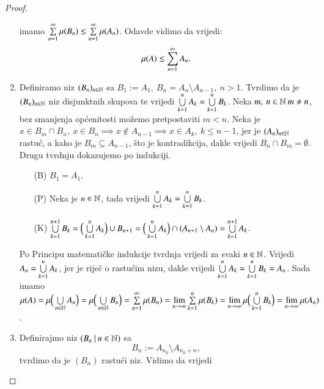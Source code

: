 \begin{proof}
\begin{enumerate}[label={(\roman*)}]
            imamo $\sum\limits_{n=1}^{\infty} \mu({B_n}) \leq \sum\limits_{n=1}^{\infty} \mu({A_n})$.
            Odavde vidimo da vrijedi:
            \begin{equation*}
                \mu({A}) \leq \sum\limits_{n=1}^{\infty} A_n.
            \end{equation*}
        \item Definiramo niz $(B_n)_{n \in \mathbb{N}}$ sa $B_1 := A_1, \: B_n = A_n \setminus
            A_{n-1}, \: n > 1$. Tvrdimo da je $(B_n)_{n \in \mathbb{N}}$ niz disjunktnih skupova
            te vrijedi $\bigcup\limits_{k=1}^{n} A_k = \bigcup\limits_{k=1}^{n} B_k$. Neka $m, \: n \in \mathbb{N}
            \: m \neq n$, bez smanjenja op\' cenitosti mo\v zemo pretpostaviti $m < n$.
            Neka je $x \in B_m \cap B_n, \: x \in B_n \implies x \notin A_{n-1}
            \implies x \in A_k, \: k \leq n-1$, jer je $(A_n)_{n \in \mathbb{N}}$ rastu\' c,
            a kako je $B_m \subseteq A_{n-1}$, \v sto je kontradikcija, dakle vrijedi
            $B_n \cap B_m = \emptyset$. Drugu tvrdnju dokazujemo po indukciji.
            \begin{enumerate}
                \item[(B)] $B_1 = A_1$.
                \item[(P)] Neka je $n \in \mathbb{N}$, tada vrijedi $\bigcup\limits_{k=1}^{n} A_k
                    = \bigcup\limits_{k=1}^{n} B_k$.
                \item[(K)] $\bigcup\limits_{k=1}^{n+1} B_k = \Big( \bigcup\limits_{k=1}^{n} A_k \Big) \cup B_{n+1}
                    = \Big(\bigcup\limits_{k=1}^{n} A_k \Big) \cap (A_{n+1} \setminus A_n )
                    = \bigcup\limits_{k=1}^{n+1} A_k$.
            \end{enumerate}
            Po Principu matemati\v cke indukcije tvrdnja vrijedi za svaki $n \in \mathbb{N}$.
            Vrijedi $A_n = \bigcup\limits_{k=1}^{n} A_k$, jer je rije\v c o rastu\' cim nizu,
            dakle vrijedi $\bigcup\limits_{k=1}^{n} A_k = \bigcup\limits_{k = 1}^{n} B_k = A_n$.
            Sada imamo $\mu({A}) = \mu \Big( \bigcup\limits_{n \in \mathbb{N}}^{} A_n \Big) = \mu \Big( \bigcup\limits_{n \in \mathbb{N}}^{} B_n \Big) = \sum\limits_{n=1}^{\infty} \mu({B_n})
                = \lim\limits_{n \to \infty} \sum\limits_{k=1}^{n} \mu({B_k}) = \lim\limits_{n \to \infty}
                \mu \Big( \bigcup\limits_{k=1}^{n} B_k \Big) = \lim\limits_{n \to \infty} \mu({A_n})$.
        \item Definirajmo niz $({B_n} \: | \: {n \in \mathbb{N}})$ sa
        \begin{equation*}
            B_n := A_{n_0} \setminus A_{n_0 + n},
        \end{equation*}
        tvrdimo da je  $(B_n)$ rastu\' ci niz.
        Vidimo da vrijedi

\end{enumerate}
\end{proof}
